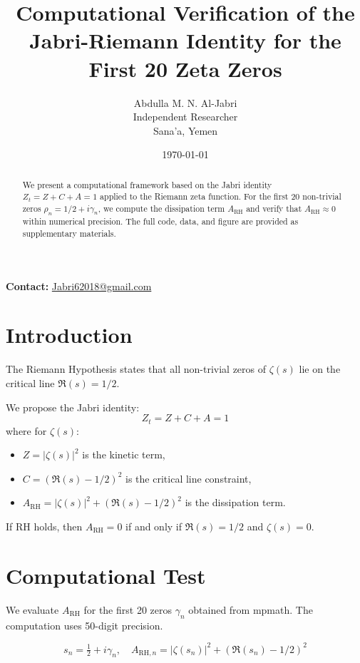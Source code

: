 \documentclass[12pt,a4paper]{article}
\title{Computational Verification of the Jabri-Riemann Identity for the First 20 Zeta Zeros}
\author{Abdulla M. N. Al-Jabri \\ Independent Researcher \\ Sana'a, Yemen}
\date{\today}
\begin{document}
\maketitle

\noindent\textbf{Contact:} \href{mailto:Jabri62018@gmail.com}{Jabri62018@gmail.com}

\begin{abstract}
We present a computational framework based on the Jabri identity $Z_t = Z + C + A = 1$ applied to the Riemann zeta function. For the first 20 non-trivial zeros $\rho_n = 1/2 + i\gamma_n$, we compute the dissipation term $A_{\text{RH}}$ and verify that $A_{\text{RH}} \approx 0$ within numerical precision. The full code, data, and figure are provided as supplementary materials.
\end{abstract}

\section{Introduction}
The Riemann Hypothesis states that all non-trivial zeros of $\zeta(s)$ lie on the critical line $\Re(s)=1/2$.

We propose the Jabri identity:
\begin{equation}
Z_t = Z + C + A = 1
\end{equation}
where for $\zeta(s)$:
\begin{itemize}
    \item $Z = |\zeta(s)|^2$ is the kinetic term,
    \item $C = (\Re(s)-1/2)^2$ is the critical line constraint,
    \item $A_{\text{RH}} = |\zeta(s)|^2 + (\Re(s)-1/2)^2$ is the dissipation term.
\end{itemize}

If RH holds, then $A_{\text{RH}}=0$ if and only if $\Re(s)=1/2$ and $\zeta(s)=0$.

\section{Computational Test}

We evaluate $A_{\text{RH}}$ for the first 20 zeros $\gamma_n$ obtained from mpmath. The computation uses 50-digit precision.

\begin{equation}
s_n = \tfrac{1}{2} + i\gamma_n, \quad A_{\text{RH},n} = |\zeta(s_n)|^2 + (\Re(s_n)-1/2)^2
\end{equation}
\end{document}

